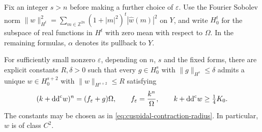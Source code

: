 Fix an integer $s>n$ before making a further choice of $\varepsilon$. Use the Fourier Sobolev norm
$\|w\|_{H^t}^2=\sum_{m\in\mathbb Z^{2n}}(1+|m|^2)^t|\widehat w(m)|^2$ on $Y$, and write $H^t_0$ for the subspace of real functions in $H^t$ with zero mean with respect to $\Omega$. In the remaining formulas, $\alpha$ denotes its pullback to $Y$.

\begin{theorem}\label{thm:cuspidal-quantitative-equation}
For sufficiently small nonzero $\varepsilon$, depending on $n$, $s$ and the fixed forms, there are explicit constants $R,\delta>0$ such that every $g\in H^s_0$ with $\|g\|_{H^s}\leq\delta$ admits a unique $w\in H^{s+2}_0$ with $\|w\|_{H^{s+2}}\leq R$ satisfying
\[
 (k+\mathrm{dd}^{\mathrm{c}} w)^n=(f_\varepsilon+g)\Omega,
 \qquad f_\varepsilon=\frac{k^n}{\Omega},\qquad
 k+\mathrm{dd}^{\mathrm{c}} w\geq\tfrac14K_0.
\]
The constants may be chosen as in \eqref{eq:cuspidal-contraction-radius}. In particular, $w$ is of class $C^2$.
\end{theorem}
